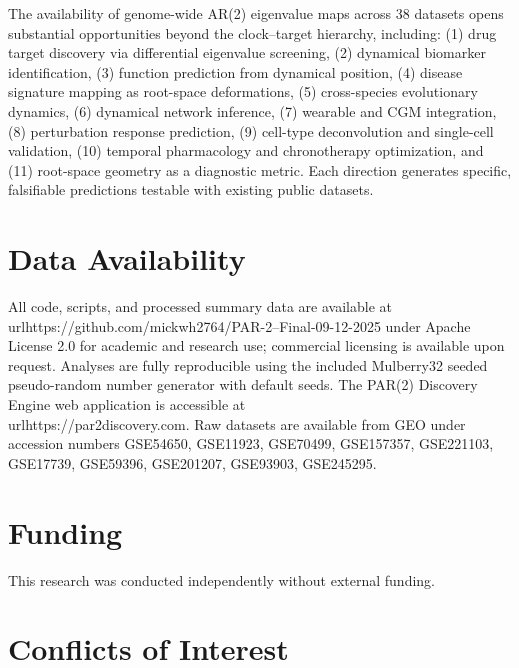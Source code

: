 \documentclass[11pt,a4paper]{article}
\begin{document}
The availability of genome-wide AR(2) eigenvalue maps across 38 datasets opens substantial opportunities beyond the clock--target hierarchy, including: (1) drug target discovery via differential eigenvalue screening, (2) dynamical biomarker identification, (3) function prediction from dynamical position, (4) disease signature mapping as root-space deformations, (5) cross-species evolutionary dynamics, (6) dynamical network inference, (7) wearable and CGM integration, (8) perturbation response prediction, (9) cell-type deconvolution and single-cell validation, (10) temporal pharmacology and chronotherapy optimization, and (11) root-space geometry as a diagnostic metric. Each direction generates specific, falsifiable predictions testable with existing public datasets.

\section*{Data Availability}

All code, scripts, and processed summary data are available at \\url{https://github.com/mickwh2764/PAR-2--Final-09-12-2025} under Apache License 2.0 for academic and research use; commercial licensing is available upon request. Analyses are fully reproducible using the included Mulberry32 seeded pseudo-random number generator with default seeds. The PAR(2) Discovery Engine web application is accessible at \\url{https://par2discovery.com}. Raw datasets are available from GEO under accession numbers GSE54650, GSE11923, GSE70499, GSE157357, GSE221103, GSE17739, GSE59396, GSE201207, GSE93903, GSE245295.

\section*{Funding}

This research was conducted independently without external funding.

\section*{Conflicts of Interest}
\end{document}
